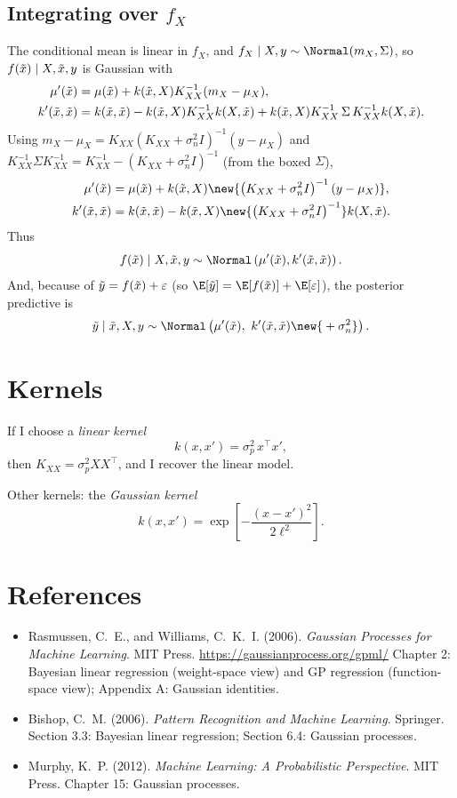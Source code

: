 \subsection{Integrating over $f_X$}
The conditional mean is linear in $f_X$, and $f_X \mid X, y \sim \Normal(m_X, \Sigma)$, so $f(\tilde x) \mid X, \tilde x, y$ is Gaussian with
\begin{align*}
\mu'(\tilde x) &= \mu(\tilde x) + k(\tilde x, X)K_{XX}^{-1}(m_X - \mu_X),\\
k'(\tilde x, \tilde x) &= k(\tilde x, \tilde x) - k(\tilde x, X)K_{XX}^{-1}k(X, \tilde x) + k(\tilde x, X)K_{XX}^{-1}\,\Sigma\,K_{XX}^{-1}k(X, \tilde x).
\end{align*}
Using $m_X - \mu_X = K_{XX}(K_{XX} + \sigma_n^2 I)^{-1}(y - \mu_X)$ and $K_{XX}^{-1}\Sigma K_{XX}^{-1} = K_{XX}^{-1} - (K_{XX} + \sigma_n^2 I)^{-1}$ (from the boxed $\Sigma$),
\begin{align*}
\mu'(\xt) &= \mu(\xt) + k(\xt, X)\new{\left(K_{XX} + \sigma_n^2 I\right)^{-1}(y - \mu_X)},\\
k'(\xt, \xt) &= k(\xt, \xt) - k(\xt, X)\new{\left(K_{XX} + \sigma_n^2 I\right)^{-1}}k(X, \xt).
\end{align*}
Thus
\[
f(\xt) \mid X, \xt, y \sim \Normal\left(\mu'(\xt), k'(\xt, \xt)\right).
\]
And, because of $\tilde y = f(\tilde x) + \varepsilon$ (so $\E[\yt] = \E[f(\xt)] + \E[\varepsilon]$), the posterior predictive is
\[
\yt \mid \xt, X, y \sim \Normal\left(\mu'(\xt),\ k'(\xt, \xt) \new{{}+ \sigma_n^2}\right).
\]

\section{Kernels}
If I choose a \emph{linear kernel}
\[
k(x, x') = \sigma_p^2\,x^{\top}x',
\]
then $K_{XX} = \sigma_p^2XX^{\top}$, and I recover the linear model.

Other kernels: the \emph{Gaussian kernel}
\[
k(x, x') = \exp\left[-\frac{(x - x')^2}{2\ell^2}\right].
\]

\section*{References}
\begin{itemize}
\item Rasmussen, C.~E., and Williams, C.~K.~I. (2006). \emph{Gaussian Processes for Machine Learning}. MIT Press. \url{https://gaussianprocess.org/gpml/} Chapter 2: Bayesian linear regression (weight-space view) and GP regression (function-space view); Appendix A: Gaussian identities.
\item Bishop, C.~M. (2006). \emph{Pattern Recognition and Machine Learning}. Springer. Section 3.3: Bayesian linear regression; Section 6.4: Gaussian processes.
\item Murphy, K.~P. (2012). \emph{Machine Learning: A Probabilistic Perspective}. MIT Press. Chapter 15: Gaussian processes.
\end{itemize}


